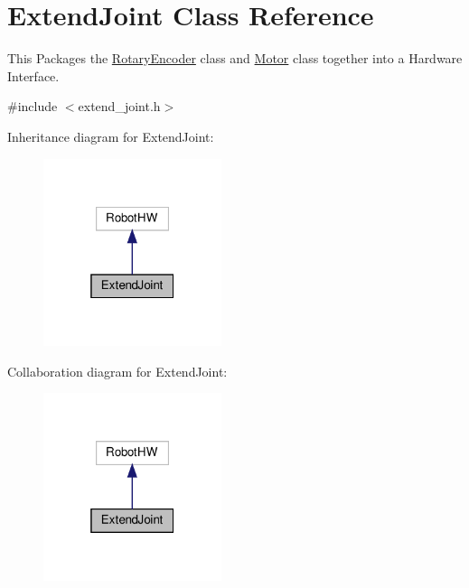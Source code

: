 \hypertarget{classExtendJoint}{}\section{Extend\+Joint Class Reference}
\label{classExtendJoint}


This Packages the \hyperlink{classRotaryEncoder}{Rotary\+Encoder} class and \hyperlink{classMotor}{Motor} class together into a Hardware Interface.  




{\ttfamily \#include $<$extend\+\_\+joint.\+h$>$}



Inheritance diagram for Extend\+Joint\+:\nopagebreak
\begin{figure}[H]
\begin{center}
\leavevmode
\includegraphics[width=148pt]{classExtendJoint__inherit__graph}
\end{center}
\end{figure}


Collaboration diagram for Extend\+Joint\+:\nopagebreak
\begin{figure}[H]
\begin{center}
\leavevmode
\includegraphics[width=148pt]{classExtendJoint__coll__graph}
\end{center}
\end{figure}
